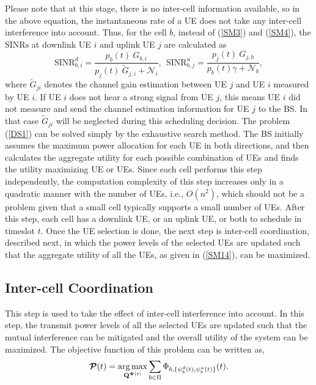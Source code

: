 \documentclass[journal]{IEEEtran}
\DeclareMathOperator*{\argmax}{arg\,max}
\begin{document}
Please note that at this stage, there is no inter-cell information available, so in the above equation, the instantaneous rate of a UE does not take any inter-cell interference into account. Thus, for the cell $b$, instead of (\ref{SM3}) and (\ref{SM4}), the $\text{SINRs}$ at downlink UE $i$ and uplink UE $j$ are calculated as 
\begin{equation}\label{DS2}
\text{SINR}_{b,i}^d = \frac{p_b(t)~G_{b,i}}{ p_{j}(t)~\widetilde{G}_{j,i} + \mathcal{N}_{i} }, ~~\text{SINR}_{b,j}^u = \frac{p_{j}(t)~G_{j,b}}{ p_b(t) \gamma + \mathcal{N}_{b}},
\end{equation}
where $\widetilde{G}_{ji}$ denotes the channel gain estimation between UE $j$ and UE $i$ measured by UE $i$. If UE $i$ does not hear a strong signal from UE $j$, this means UE $i$ did not measure and send the channel estimation information for UE $j$ to the BS. In that case $\widetilde{G}_{ji}$ will be neglected during this scheduling decision. The problem (\ref{DS1}) can be solved simply by the exhaustive search method. The BS initially assumes the maximum power allocation for each UE in both directions, and then calculates the aggregate utility for each possible combination of UEs and finds the utility maximizing UE or UEs. Since each cell performs this step independently, the computation complexity of this step increases only in a quadratic manner with the number of UEs, i.e., $O(n^2)$, which should not be a problem given that a small cell typically supports a small number of UEs. After this step, each cell has a downlink UE, or an uplink UE, or both to schedule in timeslot $t$. Once the UE selection is done, the next step is inter-cell coordination, described next, in which the power levels of the selected UEs are updated such that the aggregate utility of all the UEs, as given in (\ref{SM14}), can be maximized.

\subsection{Inter-cell Coordination}\label{sec:DSS2}
This step is used to take the effect of inter-cell interference into account. In this step, the transmit power levels of all the selected UEs are updated such that the mutual interference can be mitigated and the overall utility of the system can be maximized. The objective function of this problem can be written as,
\begin{equation}\label{DS5}
     \boldsymbol{\mathcal{P}}(t) = \argmax_{\boldsymbol{\mathrm{Q}}^{\boldsymbol{\Psi}(t)}} \sum\limits_{b \in \Pi} \Phi_{b,\{\psi_b^d(t),\psi_b^u(t)\}}(t).\\
 \end{equation}
\end{document}
